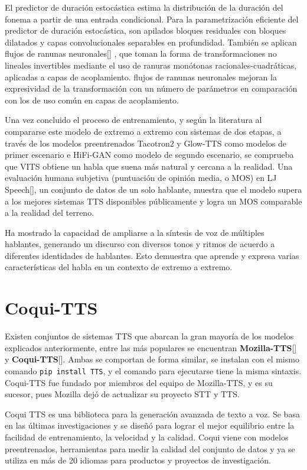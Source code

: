 El predictor de duración estocástica estima la distribución de la duración del fonema a partir de una entrada condicional. Para la parametrización eficiente del predictor de duración estocástica, son apilados bloques residuales con bloques dilatados y capas convolucionales separables en profundidad. También se aplican flujos de ranunas neuronales[\cite{durkan2019neural}] , que toman la forma de transformaciones no lineales invertibles mediante el uso de ranuras monótonas racionales-cuadráticas, aplicadas a capas de acoplamiento. flujos de ranunas neuronales mejoran la expresividad de la transformación con un número de parámetros en comparación con los de uso común en capas de acoplamiento. 

Una vez concluido el proceso de entrenamiento, y según la literatura al compararse este modelo de extremo a extremo con sistemas de dos etapas, a través de los modelos preentrenados Tacotron2 y Glow-TTS como modelos de primer escenario e HiFi-GAN como modelo de segundo escenario, se comprueba que VITS obtiene un habla que suena más natural y cercana a la realidad. Una evaluación humana subjetiva (puntuación de opinión media, o MOS) en LJ Speech[\cite{ljspeech}], un conjunto de datos de un solo hablante, muestra que el modelo supera a los mejores sistemas TTS disponibles públicamente y logra un MOS comparable a la realidad del terreno.

Ha mostrado la capacidad de ampliarse a la síntesis de voz de múltiples hablantes, generando un discurso con diversos tonos y ritmos de acuerdo a diferentes identidades de hablantes. Esto demuestra que aprende y expresa varias características del habla en un contexto de extremo a extremo.\\

\section{Coqui-TTS}
Existen conjuntos de sistemas TTS que abarcan la gran mayoría de los modelos explicados anteriormente, entre las más populares se encuentran \textbf{Mozilla-TTS}[\cite{mozilla-doc}] y \textbf{Coqui-TTS}[\cite{coqui-doc}]. Ambas se comportan de forma similar, se instalan con el mismo comando \texttt{pip install TTS}, y el comando para ejecutarse tiene la misma sintaxis. Coqui-TTS fue fundado por miembros del equipo de Mozilla-TTS, y es su sucesor, pues Mozilla dejó de actualizar su proyecto STT y TTS.

Coqui TTS es una biblioteca para la generación avanzada de texto a voz. Se basa en las últimas investigaciones y se diseñó para lograr el mejor equilibrio entre la facilidad de entrenamiento, la velocidad y la calidad. Coqui viene con modelos preentrenados, herramientas para medir la calidad del conjunto de datos y ya se utiliza en más de 20 idiomas para productos y proyectos de investigación.

